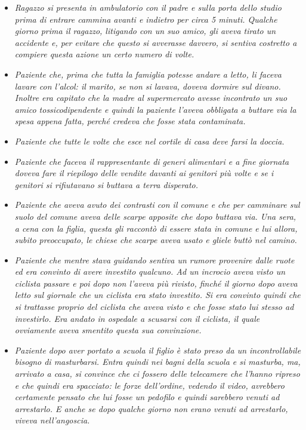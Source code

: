 \documentclass[]{article}
\begin{document}
\begin{itemize}
\item
  \emph{Ragazzo si presenta in ambulatorio con il padre e sulla porta
  dello studio prima di entrare cammina avanti e indietro per circa 5
  minuti. Qualche giorno prima il ragazzo, litigando con un suo amico,
  gli aveva tirato un accidente e, per evitare che questo si avverasse
  davvero, si sentiva costretto a compiere questa azione un certo numero
  di volte.}
\item
  \emph{Paziente che, prima che tutta la famiglia potesse andare a
  letto, li faceva lavare con l'alcol: il marito, se non si lavava,
  doveva dormire sul divano. Inoltre era capitato che la madre al
  supermercato avesse incontrato un suo amico tossicodipendente e quindi
  la paziente l'aveva obbligata a buttare via la spesa appena fatta,
  perché credeva che fosse stata contaminata.}
\item
  \emph{Paziente che tutte le volte che esce nel cortile di casa deve
  farsi la doccia.}
\item
  \emph{Paziente che faceva il rappresentante di generi alimentari e a
  fine giornata doveva fare il riepilogo delle vendite davanti ai
  genitori più volte e se i genitori si rifiutavano si buttava a terra
  disperato.}
\item
  \emph{Paziente che aveva avuto dei contrasti con il comune e che per
  camminare sul suolo del comune aveva delle scarpe apposite che dopo
  buttava via. Una sera, a cena con la figlia, questa gli raccontò di
  essere stata in comune e lui allora, subito preoccupato, le chiese che
  scarpe aveva usato e gliele buttò nel camino.}
\item
  \emph{Paziente che mentre stava guidando sentiva un rumore provenire
  dalle ruote ed era convinto di avere investito qualcuno. Ad un
  incrocio aveva visto un ciclista passare e poi dopo non l'aveva più
  rivisto, finché il giorno dopo aveva letto sul giornale che un
  ciclista era stato investito. Si era convinto quindi che si trattasse
  proprio del ciclista che aveva visto e che fosse stato lui stesso ad
  investirlo. Era andato in ospedale a scusarsi con il ciclista, il
  quale ovviamente aveva smentito questa sua convinzione. }
\item
  \emph{Paziente dopo aver portato a scuola il figlio è stato preso da
  un incontrollabile bisogno di masturbarsi. Entra quindi nei bagni
  della scuola e si masturba, ma, arrivato a casa, si convince che ci
  fossero delle telecamere che l'hanno ripreso e che quindi era
  spacciato: le forze dell'ordine, vedendo il video, avrebbero
  certamente pensato che lui fosse un pedofilo e quindi sarebbero venuti
  ad arrestarlo. E anche se dopo qualche giorno non erano venuti ad
  arrestarlo, viveva nell'angoscia. }
\end{itemize}
\end{document}
